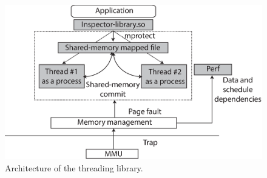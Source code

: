 
\begin{figure}[t]

\centering
      \includegraphics[scale=.35]{figure/Library-architecture}
  \caption{Architecture of the threading library.}
   
  \label{fig:lib-architecture}

\end{figure}
